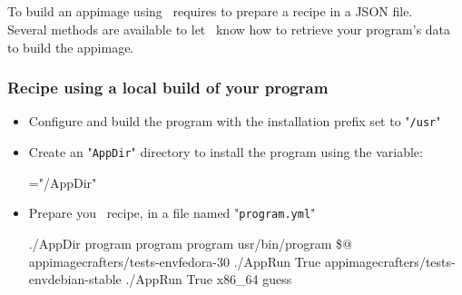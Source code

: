 \subsection{\abuild}

To build an appimage using \abuild\ requires to prepare a recipe in a JSON file. \\
Several methods are available to let \abuild\ know how to retrieve your program's data to build the appimage. 

\subsubsection*{Recipe using a local build of your program}

\begin{itemize}
\item Configure and build the program with the installation prefix set to "\texttt{/usr}"
{\footnotesize{
\begin{scripti}
  
 
\end{scripti}
}}
\item Create an "\texttt{AppDir}" directory to install the program using the  variable: 
{\footnotesize{
\begin{scripti}
  
   ="/AppDir"
\end{scripti}
}}
\item Prepare you \abuild\ recipe, in a file named "\texttt{program.yml}" 
{\footnotesize{
\begin{scripti}
 
   ./AppDir
     program     
     program   
     program   
     
     usr/bin/program
     \$@
       appimagecrafters/tests-envfedora-30
       ./AppRun
       True
       appimagecrafters/tests-envdebian-stable
       ./AppRun
       True
   x86\_64
   guess
\end{scripti}
}}
\end{itemize}

